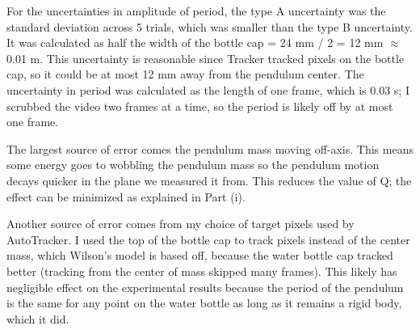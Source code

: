 \documentclass[notitlepage, twocolumn, 12pt]{article}
\begin{document}
    For the uncertainties in amplitude of period, the type A uncertainty was the standard deviation across 5 trials, which was smaller than the type B uncertainty. It was calculated as half the width of the bottle cap = 24 mm / 2 = 12 mm $\approx$ 0.01 m. This uncertainty is reasonable since Tracker tracked pixels on the bottle cap, so it could be at most 12 mm away from the pendulum center. The uncertainty in period was calculated as the length of one frame, which is $0.03$ s; I scrubbed the video two frames at a time, so the period is likely off by at most one frame.

    The largest source of error comes the pendulum mass moving off-axis. This means some energy goes to wobbling the pendulum mass so the pendulum motion decays quicker in the plane we measured it from. This reduces the value of Q; the effect can be minimized as explained in Part (i). 

    Another source of error comes from my choice of target pixels used by AutoTracker. I used the top of the bottle cap to track pixels instead of the center mass, which Wilson's model is based off, because the water bottle cap tracked better (tracking from the center of mass skipped many frames). This likely has negligible effect on the experimental results because the period of the pendulum is the same for any point on the water bottle as long as it remains a rigid body, which it did.
    
\end{document}
